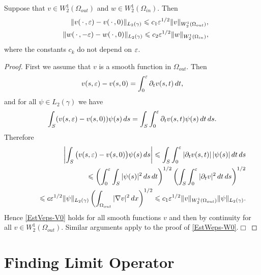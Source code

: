 \begin{proposition}\label{PropTrace}
  Suppose that $v\in W_2^{1}(\Omega_{out})$  and $w\in W_2^{1}(\Omega_{in})$. Then
\begin{eqnarray}\label{EstVeps-V0}
&&\|v(\,\cdot\,,\varepsilon)-v(\,\cdot\,,0)\|_{L_2(\gamma)}\leqslant
c_1\varepsilon^{1/2}\|v\|_{W_2^1(\Omega_{out})}, \\\label{EstWeps-W0} &&\|w(\,\cdot\,,-\varepsilon)-w(\,\cdot\,,0)\|_{L_2(\gamma)}\leqslant
c_2\varepsilon^{1/2}\|w\|_{W_2^1(\Omega_{in})},
\end{eqnarray}
where the constants $c_k$ do not depend on $\varepsilon$.
\end{proposition}
\begin{proof}
  First we assume that $v$ is a smooth function in $\Omega_{out}$. Then
$$
 v(s,\varepsilon)-v(s,0)=\int_0^\varepsilon \partial_t v(s,t)\,dt,
$$
and for all $\psi\in L_2(\gamma)$ we have
$$
\int_S(v(s,\varepsilon)-v(s,0))\psi(s)\,ds=\int_S\int_0^\varepsilon\partial_t v(s,t)\psi(s)\,dt\,ds.
$$
Therefore
\begin{eqnarray}\nonumber
&&\left|\int_S\big(v(s,\varepsilon)-v(s,0)\big)\psi(s)\,ds\right|\leqslant
\int_S\int_0^\varepsilon|\partial_t v(s,t)|\,|\psi(s)|\,dt\,ds
\\\nonumber
&&\kern20pt\leqslant \left(\int_0^\varepsilon \int_S|\psi(s)|^2\,ds\,dt\right)^{1/2}
\left(\int_S\int_0^\varepsilon |\partial_t v|^2\,dt\,ds\right)^{1/2}
\\\nonumber
&&\kern20pt\leqslant c\varepsilon^{1/2}\|\psi\|_{L_2(\gamma)}
\left(\int_{\Omega_{out}}|\nabla v|^2\,dx\right)^{1/2}\leqslant c_1\varepsilon^{1/2}\|v\|_{W_2^1(\Omega_{out})}\|\psi\|_{L_2(\gamma)}.
\end{eqnarray}
Hence \eqref{EstVeps-V0} holds for all smooth functions $v$ and then by continuity for all $v\in W_2^{1}(\Omega_{out})$.
Similar arguments apply to the proof of \eqref{EstWeps-W0}.\hfill$\Box$
\end{proof}



\section{Finding Limit Operator}
\label{Sec:LimitOperator}

